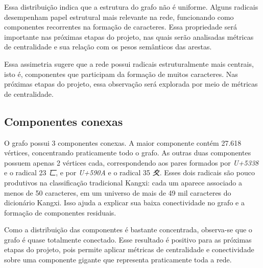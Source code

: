 \documentclass[10pt, a4paper]{extarticle}
\begin{document}
Essa distribuição indica que a estrutura do grafo não é uniforme. Alguns radicais desempenham papel estrutural mais relevante na rede, funcionando como componentes recorrentes na formação de caracteres. Essa propriedade será importante nas próximas etapas do projeto, nas quais serão analisadas métricas de centralidade e sua relação com os pesos semânticos das arestas.

Essa assimetria sugere que a rede possui radicais estruturalmente mais centrais, isto é, componentes que participam da formação de muitos caracteres. Nas próximas etapas do projeto, essa observação será explorada por meio de métricas de centralidade.

\subsection{Componentes conexas}
O grafo possui 3 componentes conexas. A maior componente contém 27.618 vértices, concentrando praticamente todo o grafo. As outras duas componentes possuem apenas 2 vértices cada, correspondendo aos pares formados por \textit{U+5338} e o radical 23 \textit{匸}, e por \textit{U+590A} e o radical 35 \textit{夊}. Esses dois radicais são pouco produtivos na classificação tradicional Kangxi: cada um aparece associado a menos de 50 caracteres, em um universo de mais de 49 mil caracteres do dicionário Kangxi. Isso ajuda a explicar sua baixa conectividade no grafo e a formação de componentes residuais.

Como a distribuição das componentes é bastante concentrada, observa-se que o grafo é quase totalmente conectado. Esse resultado é positivo para as próximas etapas do projeto, pois permite aplicar métricas de centralidade e conectividade sobre uma componente gigante que representa praticamente toda a rede.
\end{document}
